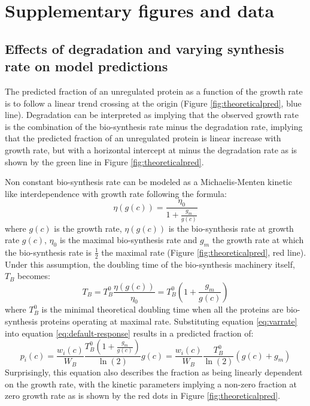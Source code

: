 \documentclass{article}
\newcommand{\beginsupplement}{%
        \setcounter{table}{0}
        \renewcommand{\thetable}{S\arabic{table}}%
        \setcounter{figure}{0}
        \renewcommand{\thefigure}{S\arabic{figure}}%
    }
\begin{document}

\section{Supplementary figures and data}
\beginsupplement

\subsection{Effects of degradation and varying synthesis rate on model predictions}
\label{theoreticalintercep}
The predicted fraction of an unregulated protein as a function of the growth rate is to follow a linear trend crossing at the origin (Figure \ref{fig:theoreticalpred}, blue line).
Degradation can be interpreted as implying that the observed growth rate is the combination of the bio-synthesis rate minus the degradation rate, implying that the predicted fraction of an unregulated protein is linear increase with growth rate, but with a horizontal intercept at minus the degradation rate as is shown by the green line in Figure \ref{fig:theoreticalpred}.

Non constant bio-synthesis rate can be modeled as a Michaelis-Menten kinetic like interdependence with growth rate following the formula:
\begin{equation}
\eta(g(c))=\frac{\eta_0}{1+\frac{g_m}{g(c)}}
\end{equation}
where $g(c)$ is the growth rate, $\eta(g(c))$ is the bio-synthesis rate at growth rate $g(c)$, $\eta_0$ is the maximal bio-synthesis rate and $g_m$ the growth rate at which the bio-synthesis rate is $\frac{1}{2}$ the maximal rate (Figure \ref{fig:theoreticalpred}, red line).
Under this assumption, the doubling time of the bio-synthesis machinery itself, $T_B$ becomes:
\begin{equation}
\label{eq:varrate}
T_B=T_B^0\frac{\eta(g(c))}{\eta_0}=T_B^0(1+\frac{g_m}{g(c)})
\end{equation}
where $T_B^0$ is the minimal theoretical doubling time when all the proteins are bio-synthesis proteins operating at maximal rate.
Substituting equation \ref{eq:varrate} into equation \ref{eq:default-response} results in a predicted fraction of:
\begin{equation}
p_i(c)=\frac{w_i(c)}{W_B}\frac{T_B^0(1+\frac{g_m}{g(c)})}{\ln(2)}g(c) = \frac{w_i(c)}{W_B}\frac{T_B^0}{\ln(2)}(g(c)+g_m)
\end{equation}
Surprisingly, this equation also describes the fraction as being linearly dependent on the growth rate, with the kinetic parameters implying a non-zero fraction at zero growth rate as is shown by the red dots in Figure \ref{fig:theoreticalpred}.
\end{document}
